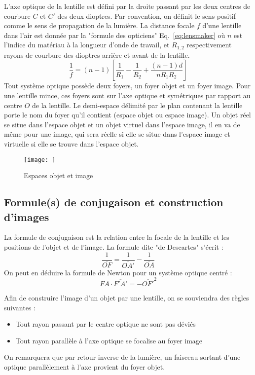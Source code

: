 \documentclass[a4paper]{article}
\begin{document}
L'axe optique de la lentille est défini par la droite passant par les deux centres de courbure $C$ et $C'$ des deux dioptres. Par convention, on définit le sens positif comme le sens de propagation de la lumière.  La distance focale $f$ d'une lentille dans l'air est donnée par la "formule des opticiens" Eq.~\ref{eq:lensmaker} où $n$ est l'indice du matériau à la longueur d'onde de travail, et $R_{1, 2}$ respectivement rayons de courbure des dioptres arrière et avant de la lentille. 
\begin{equation}
\label{eq:lensmaker}
\frac{1}{f}=(n-1)\left[\frac{1}{R_1}-\frac{1}{R_2}+\frac{(n-1)d}{n R_1 R_2}\right]
\end{equation}
Tout système optique possède deux foyers, un foyer objet et un foyer image. Pour une lentille mince, ces foyers sont sur l'axe optique et symétriques par rapport au centre $O$ de la lentille. Le demi-espace délimité par le plan contenant la lentille porte le nom du foyer qu'il contient (espace objet ou espace image). Un objet réel se situe dans l'espace objet et un objet virtuel dans l'espace image, il en va de même pour une image, qui sera réelle si elle se situe dans l'espace image et virtuelle si elle se trouve dans l'espace objet.
\begin{figure}[!htbp]
\label{fig:espaces_lentille_mince}
\begin{center}
\texttt{[image: ]}
\end{center}
\caption{Espaces objet et image}
\end{figure}

\subsection{Formule(s) de conjugaison et construction d'images}

La formule de conjugaison est la relation entre la focale de la lentille et les positions de l'objet et de l'image. La formule dite "de Descartes" s'écrit :
\begin{equation}
\label{eq:descartes}
\frac{1}{\overline{OF}}=\frac{1}{\overline{OA'}}-\frac{1}{\overline{OA}}
\end{equation}
On peut en déduire la formule de Newton pour un système optique centré : 
\begin{equation}
\label{eq:newton}
\overline{FA}\cdot\overline{F'A'}=-\overline{OF'}^2
\end{equation}

Afin de construire l'image d'un objet par une lentille, on se souviendra des règles suivantes : 
\begin{itemize}
    \item Tout rayon passant par le centre optique ne sont pas déviés
    \item Tout rayon parallèle à l'axe optique se focalise au foyer image
\end{itemize}
On remarquera que par retour inverse de la lumière, un faisceau sortant d'une optique parallèlement à l'axe provient du foyer objet.
\end{document}
